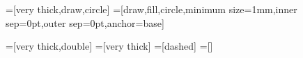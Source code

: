 %
%
%
%
%
%

=[very thick,draw,circle]
=[draw,fill,circle,minimum size=1mm,inner sep=0pt,outer
  sep=0pt,anchor=base]
\newcommand{\nt}{\Large\bf} %
\newcommand{\ntm}{\LARGE} %
\newcommand{\pmt}{\Large} %

=[very thick,double]
=[very thick]
=[dashed]
=[]

\makeatletter

\def\preparelogo{
    \pgftext[center]{\raisebox{-0.75ex}{\ntm $\mathbf{\rho}$}}
}

\def\measlogo{
    \pgfpathmoveto{\pgfpoint{-0.3cm}{-0.2cm}}
    \pgfpathcurveto{\pgfpoint{-0.3cm}{0.1cm}}{\pgfpoint{0.3cm}{0.1cm}}{\pgfpoint{0.3cm}{-0.2cm}}
    \pgfpathmoveto{\pgfpoint{0cm}{-0.2cm}}
    \pgfpathlineto{\pgfpoint{0.2cm}{0.2cm}}
    \pgfpathmoveto{\pgfpoint{0.2cm}{0.2cm}}
    \pgfpathlineto{\pgfpoint{0.25cm}{0.1cm}}
    \pgfpathmoveto{\pgfpoint{0.2cm}{0.2cm}}
    \pgfpathlineto{\pgfpoint{0.1cm}{0.15cm}}
    \pgfsetlinewidth{0.9pt}
    \pgfusepath{stroke}
}

\def\siftlogo{
    \pgfpathmoveto{\pgfpoint{-0.2cm}{-0.1cm}}
    \pgfpathlineto{\pgfpoint{0.2cm}{-0.1cm}}
    \pgfpathmoveto{\pgfpoint{-0.2cm}{0.1cm}}
    \pgfpathlineto{\pgfpoint{0.2cm}{0.1cm}}
    \pgfsetlinewidth{1.2pt}
    \pgfusepath{stroke}
}

